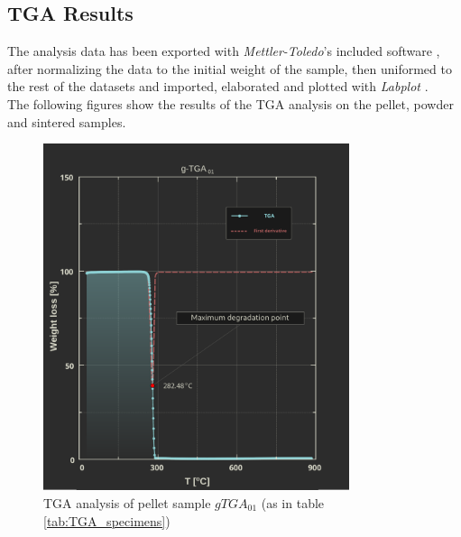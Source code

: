 \documentclass{article}
\begin{document}
        \subsection{TGA Results\label{TGA_Results}}
        The analysis data has been exported with \textit{Mettler-Toledo}'s included software \autocites{Mettler_Toledo}, after normalizing the data to the initial weight of the sample,
        then uniformed to the rest of the datasets and imported, elaborated and plotted with \textit{Labplot} \autocites{Labplot}. \\
        The following figures show the results of the TGA analysis on the pellet, powder and sintered samples. \\ 
        \begin{figure}[h!]
            \centering
            \includegraphics[width=0.8\textwidth]{Pictures/Thermal_analysis_plots/TGA_catalogued/Fixed/g-TGA01.pdf}
            \caption{TGA analysis of pellet sample $gTGA_{01}$ (as in table \ref{tab:TGA_specimens})}
            \label{fig:TGA_01}
        \end{figure}
\end{document}
